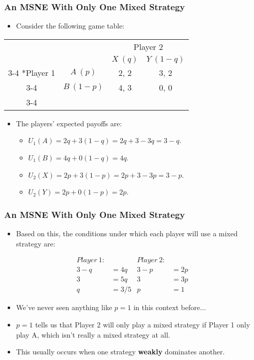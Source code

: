 \begin{frame}
\frametitle{An MSNE With Only One Mixed Strategy}
\begin{itemize}
	\item Consider the following game table:
\end{itemize}
\begin{table}[h]
	\centering
	\begin{tabular}{cc|c|c|}
		& \multicolumn{1}{c}{} & \multicolumn{2}{c}{Player 2}\\
		& \multicolumn{1}{c}{} & \multicolumn{1}{c}{$X~(q)$}  & \multicolumn{1}{c}{$Y~(1 - q)$} \\\cline{3-4}
		\multirow{2}*{Player 1}  & $A~(p)$ & 2, 2 & 3, 2 \\\cline{3-4}
		& $B~(1 - p)$ & 4, 3 & 0, 0 \\\cline{3-4}
	\end{tabular}
\end{table}
\begin{itemize}
	\item The players' expected payoffs are:
	\begin{itemize}
		\item $U_1(A) = 2q + 3(1 - q) = 2q + 3 - 3q = 3 - q$.
		\item $U_1(B) = 4q + 0(1 - q) = 4q$.
		\item $U_2(X) = 2p + 3(1 - p) = 2p + 3 - 3p = 3 - p$.
		\item $U_2(Y) = 2p + 0(1 - p) = 2p$.
	\end{itemize}
\end{itemize}
\end{frame}

\begin{frame}
\frametitle{An MSNE With Only One Mixed Strategy}
\begin{itemize}
\item Based on this, the conditions under which each player will use a mixed strategy are:
\end{itemize}
\begin{align*}
Player~1: && Player~2:&\\
3 - q &= 4q & 3 - p &= 2p\\
3 &= 5q & 3 &= 3p\\
q &= 3/5 & p &= 1
\end{align*}
\begin{itemize}
\item We've never seen anything like $p = 1$ in this context before...
\item $p = 1$ tells us that Player 2 will only play a mixed strategy
  if Player 1 only play A, which isn't really a mixed strategy at all.
\item This usually occurs when one strategy \textbf{weakly} dominates another.
\end{itemize}
\end{frame}

